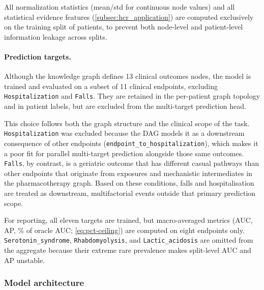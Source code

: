  All normalization statistics (mean/std for continuous node values) 
 and all statistical evidence features (\cref{subsec:hcr_application}) are computed exclusively on the training split of patients, to 
 prevent both node-level and patient-level information leakage across splits.

\paragraph{Prediction targets.}
Although the knowledge graph defines 13 
clinical outcomes nodes, the model is trained and evaluated on a
subset of 11 clinical endpoints, excluding
\texttt{Hospitalization} and
\texttt{Falls}. They are retained in the per-patient graph topology and in
patient labels, but are excluded from the multi-target prediction head.

This choice follows both the graph structure and the clinical scope of
the task. \texttt{Hospitalization} was excluded because the DAG models it
as a downstream consequence of other endpoints
(\texttt{endpoint\_to\_hospitalization}), which makes it a poor fit for
parallel multi-target prediction alongside those same outcomes. 
\texttt{Falls}, by contrast, is a geriatric outcome that has different 
casual pathways than other endpoints that originate from exposures
and mechanistic intermediates in the pharmacotherapy graph. Based on 
these conditions, falls and
hospitalisation are treated as downstream, multifactorial events outside
that primary prediction scope.

For reporting, all eleven targets are trained, but macro-averaged metrics
(AUC, AP, \% of oracle AUC; \cref{eq:pct-ceiling}) are computed on eight endpoints only.
\texttt{Serotonin\_syndrome}, \texttt{Rhabdomyolysis}, and
\texttt{Lactic\_acidosis} are omitted from the aggregate because their
extreme rare prevalence makes
split-level AUC and AP unstable.

\subsubsection{Model architecture}

